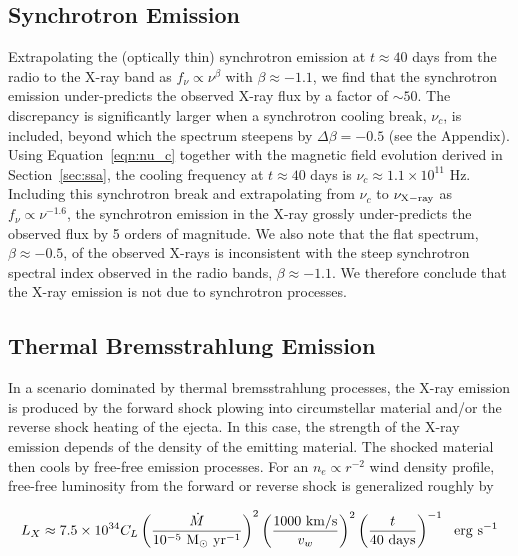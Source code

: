 \documentclass[12pt,preprint]{aastex}
\begin{document}
\subsection{Synchrotron Emission}
Extrapolating the (optically thin) synchrotron emission at $t\approx
40$ days from the radio to the X-ray band as $f_{\nu} \propto
\nu^{\beta}$ with $\beta\approx -1.1$, we find that the synchrotron
emission under-predicts the observed X-ray flux by a factor of $\sim
50$.  The discrepancy is significantly larger when a synchrotron
cooling break, $\nu_c$, is included, beyond which the spectrum
steepens by $\Delta\beta=-0.5$ (see the Appendix).  Using
Equation~\ref{eqn:nu_c} together with the magnetic field evolution
derived in Section~\ref{sec:ssa}, the cooling frequency at $t\approx
40$ days is $\nu_c \approx 1.1 \times 10^{11}$ Hz.  Including this
synchrotron break and extrapolating from $\nu_c$ to $\nu_{\rm X-ray}$
as $f_{\nu} \propto \nu^{-1.6}$, the synchrotron emission in the X-ray
grossly under-predicts the observed flux by 5 orders of magnitude.  We
also note that the flat spectrum, $\beta\approx -0.5$, of the observed
X-rays is inconsistent with the steep synchrotron spectral index
observed in the radio bands, $\beta\approx -1.1$.  We therefore
conclude that the X-ray emission is not due to synchrotron processes.

\subsection{Thermal Bremsstrahlung Emission}
In a scenario dominated by thermal bremsstrahlung processes, the X-ray
emission is produced by the forward shock plowing into circumstellar
material and/or the reverse shock heating of the ejecta.  In this
case, the strength of the X-ray emission depends of the density of the
emitting material.  The shocked material then cools by free-free
emission processes.  For an $n_e\propto r^{-2}$ wind density profile,
free-free luminosity from the forward or reverse shock is
generalized  \citep{cf01,scb+03} roughly by

\begin{equation}
L_X \approx 7.5\times 10^{34} C_L \left( \frac{\dot{M}}{10^{-5}~\rm M_{\odot}~yr^{-1}}\right)^2 \left( \frac{1000~\rm km/s}{v_w}\right)^2 \left(\frac{t}{40~\rm days}\right)^{-1} ~~\rm erg~s^{-1}
\end{equation}
\label{eqn:L_X}
\end{document}
